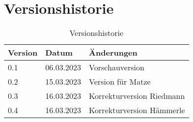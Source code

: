 \section*{Versionshistorie}

\begin{table}[H]
  \centering
  \begin{tabular}{|l|l|l|}
    \hline
    \textbf{Version} & \textbf{Datum} & \textbf{Änderungen}       \\ \hline
    0.1              & 06.03.2023     & Vorschauversion           \\ \hline
    0.2              & 15.03.2023     & Version für Matze         \\ \hline
    0.3              & 16.03.2023     & Korrekturversion Riedmann \\ \hline
    0.4              & 16.03.2023     & Korrekturversion Hämmerle \\ \hline
  \end{tabular}
  \caption{Versionshistorie}
  \label{tab:versionshistorie}
\end{table}